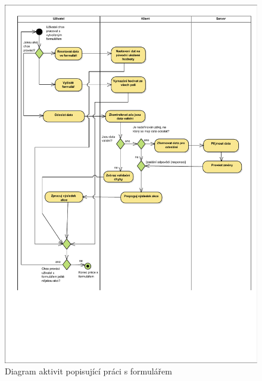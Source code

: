 \begin{figure}
\begin{center}
\includegraphics[width=\textwidth, height=\textheight]{figures/formWorkActivityDiagram}
\caption{Diagram aktivit popisující práci s formulářem}
\label{img:formWorkActivityDiagram}
\end{center}
\end{figure}


